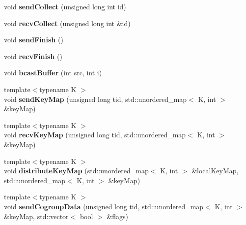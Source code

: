 \begin{DoxyCompactItemize}
\hypertarget{classfaster_1_1fastComm_a3cf9ee0da2560c2c14b4082defd43918}{}\label{classfaster_1_1fastComm_a3cf9ee0da2560c2c14b4082defd43918} 
void {\bfseries send\+Collect} (unsigned long int id)
\item 
\hypertarget{classfaster_1_1fastComm_abe93aedc98fe9f135befcba281d9255d}{}\label{classfaster_1_1fastComm_abe93aedc98fe9f135befcba281d9255d} 
void {\bfseries recv\+Collect} (unsigned long int \&id)
\item 
\hypertarget{classfaster_1_1fastComm_ae2e21e08b8a9812d8136d12e171fdbf6}{}\label{classfaster_1_1fastComm_ae2e21e08b8a9812d8136d12e171fdbf6} 
void {\bfseries send\+Finish} ()
\item 
\hypertarget{classfaster_1_1fastComm_a252c0e9fe5cb45739e4499d096fb0588}{}\label{classfaster_1_1fastComm_a252c0e9fe5cb45739e4499d096fb0588} 
void {\bfseries recv\+Finish} ()
\item 
\hypertarget{classfaster_1_1fastComm_a8dede6b029fddf4b2196cf5d47dceb7a}{}\label{classfaster_1_1fastComm_a8dede6b029fddf4b2196cf5d47dceb7a} 
void {\bfseries bcast\+Buffer} (int src, int i)
\item 
\hypertarget{classfaster_1_1fastComm_a90b5d29b062108758932e1eefa22ab64}{}\label{classfaster_1_1fastComm_a90b5d29b062108758932e1eefa22ab64} 
{\footnotesize template$<$typename K $>$ }\\void {\bfseries send\+Key\+Map} (unsigned long tid, std\+::unordered\+\_\+map$<$ K, int $>$ \&key\+Map)
\item 
\hypertarget{classfaster_1_1fastComm_a4367717fa6627c940d777204a26b0a89}{}\label{classfaster_1_1fastComm_a4367717fa6627c940d777204a26b0a89} 
{\footnotesize template$<$typename K $>$ }\\void {\bfseries recv\+Key\+Map} (unsigned long tid, std\+::unordered\+\_\+map$<$ K, int $>$ \&key\+Map)
\item 
\hypertarget{classfaster_1_1fastComm_abbe080b793ea0051e9c4ddfe81f47604}{}\label{classfaster_1_1fastComm_abbe080b793ea0051e9c4ddfe81f47604} 
{\footnotesize template$<$typename K $>$ }\\void {\bfseries distribute\+Key\+Map} (std\+::unordered\+\_\+map$<$ K, int $>$ \&local\+Key\+Map, std\+::unordered\+\_\+map$<$ K, int $>$ \&key\+Map)
\item 
\hypertarget{classfaster_1_1fastComm_a1794035cdede41cb34034aa85fd510c3}{}\label{classfaster_1_1fastComm_a1794035cdede41cb34034aa85fd510c3} 
{\footnotesize template$<$typename K $>$ }\\void {\bfseries send\+Cogroup\+Data} (unsigned long tid, std\+::unordered\+\_\+map$<$ K, int $>$ \&key\+Map, std\+::vector$<$ bool $>$ \&flags)

\end{DoxyCompactItemize}
